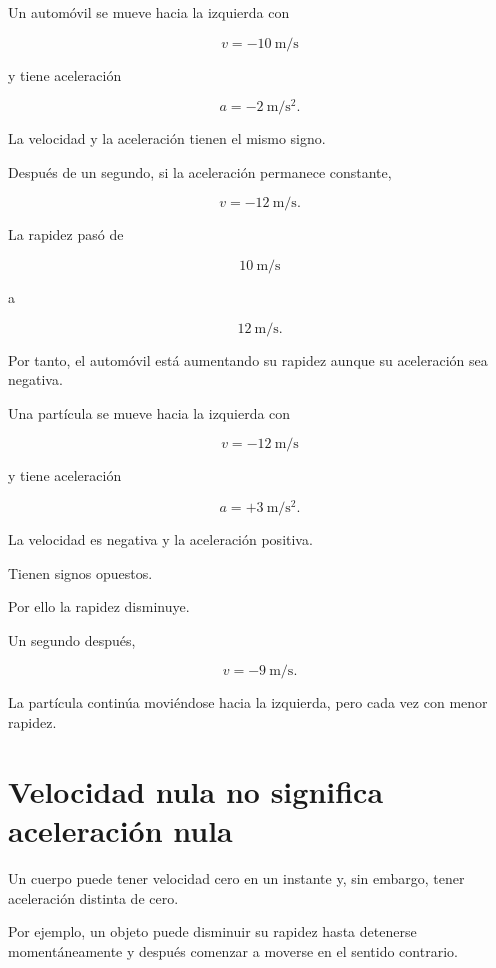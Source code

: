 \begin{ejemplo}

Un automóvil se mueve hacia la izquierda con

\[ v=-\SI{10}{\meter\per\second} \]

y tiene aceleración

\[ a=-\SI{2}{\meter\per\second\squared}. \]

La velocidad y la aceleración tienen el mismo signo.

Después de un segundo, si la aceleración permanece constante,

\[ v=-\SI{12}{\meter\per\second}. \]

La rapidez pasó de

\[ \SI{10}{\meter\per\second} \]

a

\[ \SI{12}{\meter\per\second}. \]

Por tanto, el automóvil está aumentando su rapidez aunque su aceleración sea
negativa.
\end{ejemplo}


\begin{ejemplo}

Una partícula se mueve hacia la izquierda con

\[ v=-\SI{12}{\meter\per\second} \]

y tiene aceleración

\[ a=+\SI{3}{\meter\per\second\squared}. \]

La velocidad es negativa y la aceleración positiva.

Tienen signos opuestos.

Por ello la rapidez disminuye.

Un segundo después,

\[ v=-\SI{9}{\meter\per\second}. \]

La partícula continúa moviéndose hacia la izquierda, pero cada vez con menor
rapidez.
\end{ejemplo}


\section{Velocidad nula no significa aceleración nula}

Un cuerpo puede tener velocidad cero en un instante y, sin embargo, tener
aceleración distinta de cero.

Por ejemplo, un objeto puede disminuir su rapidez hasta detenerse
momentáneamente y después comenzar a moverse en el sentido contrario.

